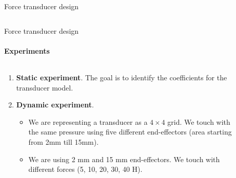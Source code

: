 \documentclass[aspectratio=169]{beamer}
\begin{document}
\begin{frame}[t]{Force transducer design}
\begin{columns}[T,onlytextwidth]
\begin{column}{0.39\textwidth}
        \end{column}
    \end{columns}
\end{frame}




\begin{frame}[t]{Force transducer design}
    \framesubtitle{Experiments}
    \vspace{-15pt}
    \begin{columns}[T,onlytextwidth]
        \begin{column}{0.6\textwidth}
            {\large
                \begin{enumerate}
                    \item \textbf{Static experiment}. The goal is to identify the coefficients for the transducer model.
                          \item\textbf{ Dynamic experiment}.
                          \begin{itemize}
                              \item We are representing a transducer as a $4\times4$ grid. We touch with the same pressure using five different end-effectors (area starting from 2mm till 15mm).
                              \item We are using 2 mm and 15 mm end-effectors. We touch with different forces (5, 10, 20, 30, 40 H).
                          \end{itemize}
                \end{enumerate}
            }
        \end{column}
        \begin{column}{0.39\textwidth}
            \vspace{-0.5cm}
            \begin{figure}[H]
                \centering
\end{figure}
\end{column}
\end{columns}
\end{frame}
\end{document}
